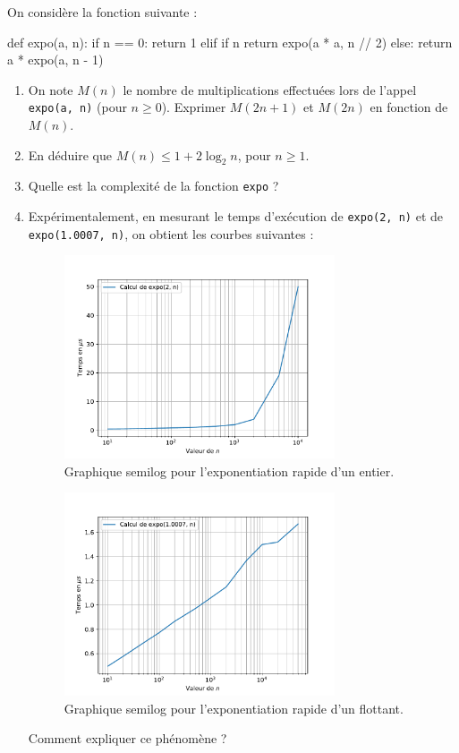 \documentclass{magnolia}
\begin{document}

  On considère la fonction suivante :
\begin{pythoncode}
def expo(a, n):
    if n == 0:
        return 1
    elif if n %
        return expo(a * a, n // 2)
    else:
        return a * expo(a, n - 1)
\end{pythoncode}
  \begin{enumerate}
    \item On note $M(n)$ le nombre de multiplications effectuées
          lors de l'appel \verb!expo(a, n)! (pour $n \geq 0$).
          Exprimer $M(2n + 1)$ et $M(2n)$ en fonction de $M(n)$.
    \item En déduire que $M(n) \leq 1 + 2 \log_{2} n$, pour $n \geq 1$.
    \item Quelle est la complexité de la fonction \verb!expo! ?
    \item Expérimentalement, en mesurant le temps d'exécution de \verb!expo(2, n)! et
    de \verb!expo(1.0007, n)!, on obtient
          les courbes suivantes :
          \begin{multicols}{2}
            \begin{figure}[H]
              \centering
              \includegraphics[width = 8cm]{../../Commun/Images/info-exos-complexite-expo-entier}
              \caption{Graphique semilog pour l'exponentiation rapide d'un entier.}
            \end{figure}
            \begin{figure}[H]
              \centering
              \includegraphics[width = 8cm]{../../Commun/Images/info-exos-complexite-expo-flottant}
              \caption{Graphique semilog pour l'exponentiation rapide d'un flottant.}
            \end{figure}
          \end{multicols}
          Comment expliquer ce phénomène ?
  \end{enumerate}
\end{document}
